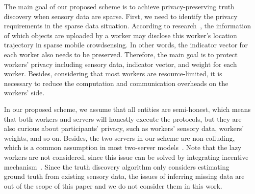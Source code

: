 \documentclass[conference]{IEEEtran}
\begin{document}
The main goal of our proposed scheme is to achieve privacy-preserving truth discovery when sensory data are sparse.
First, we need to identify the privacy requirements in the sparse data situation.
According to research~\cite{wang_sparse_2020}, the information of which objects are uploaded by a worker may disclose this worker's location trajectory in sparse mobile crowdsensing.
In other words, the indicator vector for each worker also needs to be preserved.
Therefore, the main goal is to protect workers' privacy including sensory data, indicator vector, and weight for each worker.
Besides, considering that most workers are resource-limited, it is necessary to reduce the computation and communication overheads on the workers' side.


In our proposed scheme, we assume that all entities are semi-honest, which means that both workers and servers will honestly execute the protocols, but they are also curious about participants' privacy, such as workers' sensory data, workers' weights, and so on.
Besides, the two servers in our scheme are non-colluding, which is a common assumption in most two-server models~\cite{zhang_lptd_2019,zhang_reliable_2019}.
Note that the lazy workers are not considered, since this issue can be solved by integrating incentive mechanism~\cite{xue_inpptd_2020}.
Since the truth discovery algorithm only considers estimating ground truth from existing sensory data, the issues of inferring missing data are out of the scope of this paper and we do not consider them in this work.
\end{document}
